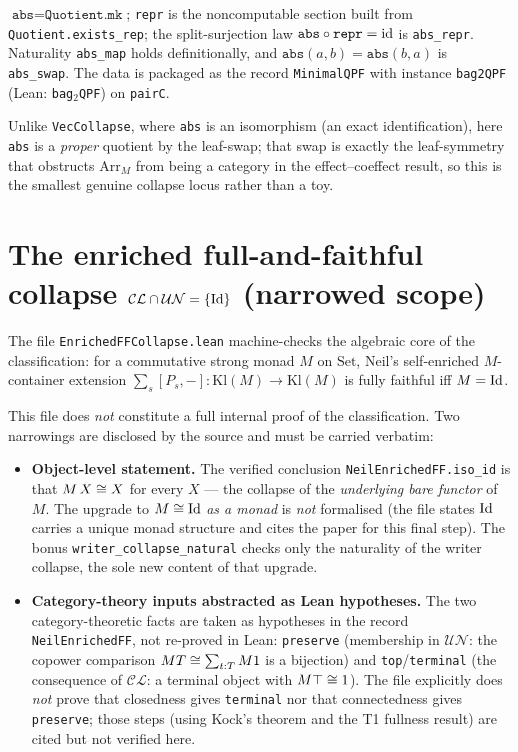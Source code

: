 \begin{proposition}
$\texttt{abs}=\texttt{Quotient.mk}$; \texttt{repr} is the noncomputable section built from \texttt{Quotient.exists\_rep}; the split-surjection law $\texttt{abs}\circ\texttt{repr}=\mathrm{id}$ is \texttt{abs\_repr}. Naturality \texttt{abs\_map} holds definitionally, and $\texttt{abs}(a,b)=\texttt{abs}(b,a)$ is \texttt{abs\_swap}. The data is packaged as the record \texttt{MinimalQPF} with instance \texttt{bag2QPF} (Lean: \texttt{bag}$_2$\texttt{QPF}) on \texttt{pairC}.
\end{proposition}

Unlike \texttt{VecCollapse}, where \texttt{abs} is an isomorphism (an exact identification), here \texttt{abs} is a \emph{proper} quotient by the leaf-swap; that swap is exactly the leaf-symmetry that obstructs $\mathrm{Arr}_M$ from being a category in the effect--coeffect result, so this is the smallest genuine collapse locus rather than a toy.

\section{The enriched full-and-faithful collapse $\mathcal{CL}\cap\mathcal{UN}=\{\mathrm{Id}\}$ (narrowed scope)}
\label{sec:leancob-enriched}

The file \texttt{EnrichedFFCollapse.lean} machine-checks the algebraic core of the classification: for a commutative strong monad $M$ on $\mathrm{Set}$, Neil's self-enriched $M$-container extension $\sum_s[P_s,-]:\mathrm{Kl}(M)\to\mathrm{Kl}(M)$ is fully faithful iff $M=\mathrm{Id}$.

\begin{remark}
\label{rem:leancob-scope}
This file does \emph{not} constitute a full internal proof of the classification. Two narrowings are disclosed by the source and must be carried verbatim:
\begin{itemize}
\item \textbf{Object-level statement.} The verified conclusion \texttt{NeilEnrichedFF.iso\_id} is that $M\,X\cong X$ for every $X$ --- the collapse of the \emph{underlying bare functor} of $M$. The upgrade to $M\cong\mathrm{Id}$ \emph{as a monad} is \emph{not} formalised (the file states $\mathrm{Id}$ carries a unique monad structure and cites the paper for this final step). The bonus \texttt{writer\_collapse\_natural} checks only the naturality of the writer collapse, the sole new content of that upgrade.
\item \textbf{Category-theory inputs abstracted as Lean hypotheses.} The two category-theoretic facts are taken as hypotheses in the record \texttt{NeilEnrichedFF}, not re-proved in Lean: \texttt{preserve} (membership in $\mathcal{UN}$: the copower comparison $M T\cong\sum_{t:T}M1$ is a bijection) and \texttt{top}/\texttt{terminal} (the consequence of $\mathcal{CL}$: a terminal object with $M\top\cong1$). The file explicitly does \emph{not} prove that closedness gives \texttt{terminal} nor that connectedness gives \texttt{preserve}; those steps (using Kock's theorem and the T1 fullness result) are cited but not verified here.
\end{itemize}
\end{remark}

